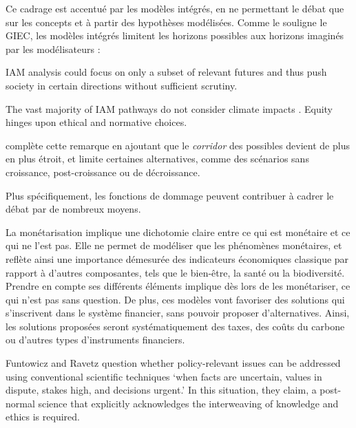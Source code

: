 Ce cadrage est accentué par les modèles intégrés, en ne permettant le débat que sur les concepts et à partir des hypothèses modélisées. Comme le souligne le GIEC, les modèles intégrés limitent les horizons possibles aux horizons imaginés par les modélisateurs : 

\begin{authoredquote}
    IAM analysis could focus on only a subset of relevant futures and thus push society in certain directions without sufficient scrutiny. 
\end{authoredquote}

\begin{authoredquote}
    The vast majority of IAM pathways do not consider climate impacts . Equity hinges upon ethical and normative choices. 
\end{authoredquote}

\textcite{cointe_ar6_2024} complète cette remarque en ajoutant que le \emph{corridor} des possibles devient de plus en plus étroit, et limite certaines alternatives, comme des scénarios sans croissance, post-croissance ou de décroissance. 

Plus spécifiquement, les fonctions de dommage peuvent contribuer à cadrer le débat par de nombreux moyens. 

La monétarisation  implique une dichotomie claire entre ce qui est monétaire et ce qui ne l'est pas. Elle ne permet de modéliser que les phénomènes monétaires, et reflète ainsi une importance démesurée des indicateurs économiques classique par rapport à d'autres composantes, tels que le bien-être, la santé ou la biodiversité. Prendre en compte ses différents éléments implique dès lors de les monétariser, ce qui n'est pas sans question. 
De plus, ces modèles vont favoriser des solutions qui s'inscrivent dans le système financier, sans pouvoir proposer d'alternatives. Ainsi, les solutions proposées seront systématiquement des taxes, des coûts du carbone ou d'autres types d'instruments financiers.



\begin{authoredquote}
    Funtowicz and Ravetz question whether policy-relevant issues can be addressed using conventional scientific techniques ‘when facts are uncertain, values in dispute, stakes high, and decisions urgent.’  In this situation, they claim, a post-normal science that explicitly acknowledges the interweaving of knowledge and ethics is required.
\end{authoredquote}


